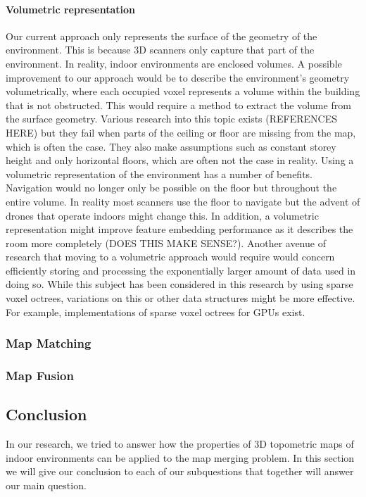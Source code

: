 \paragraph{Volumetric representation}
Our current approach only represents the surface of the geometry of the environment. This is because 3D scanners only capture that part of the environment. In reality, indoor environments are enclosed volumes. A possible improvement to our approach would be to describe the environment's geometry volumetrically, where each occupied voxel represents a volume within the building that is not obstructed. This would require a method to extract the volume from the surface geometry. Various research into this topic exists (REFERENCES HERE) but they fail when parts of the ceiling or floor are missing from the map, which is often the case. They also make assumptions such as constant storey height and only horizontal floors, which are often not the case in reality. Using a volumetric representation of the environment has a number of benefits. Navigation would no longer only be possible on the floor but throughout the entire volume. In reality most scanners use the floor to navigate but the advent of drones that operate indoors might change this. In addition, a volumetric representation might improve feature embedding performance as it describes the room more completely (DOES THIS MAKE SENSE?). Another avenue of research that moving to a volumetric approach would require would concern efficiently storing and processing the exponentially larger amount of data used in doing so. While this subject has been considered in this research by using sparse voxel octrees, variations on this or other data structures might be more effective. For example, implementations of sparse voxel octrees for GPUs exist.

\subsubsection{Map Matching}

\subsubsection{Map Fusion}

\pagebreak

\subsection{Conclusion}
In our research, we tried to answer how the properties of 3D topometric maps of indoor environments can be applied to the map merging problem. In this section we will give our conclusion to each of our subquestions that together will answer our main question.

